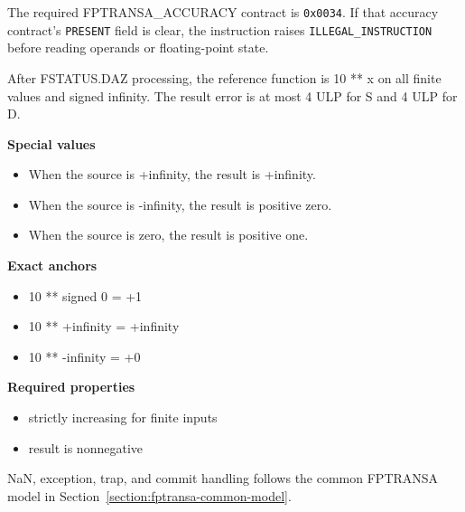 The required FPTRANSA\_ACCURACY contract is \texttt{0x0034}. If that accuracy contract's \texttt{PRESENT} field is clear, the instruction raises \texttt{ILLEGAL\_INSTRUCTION} before reading operands or floating-point state.

After FSTATUS.DAZ processing, the reference function is 10 ** x on all finite values and signed infinity. The result error is at most 4 ULP for S and 4 ULP for D.

\textbf{Special values}\par
\begin{itemize}
\item When the source is +infinity, the result is +infinity.
\item When the source is -infinity, the result is positive zero.
\item When the source is zero, the result is positive one.
\end{itemize}

\textbf{Exact anchors}\par
\begin{itemize}
\item 10 ** signed 0 = +1
\item 10 ** +infinity = +infinity
\item 10 ** -infinity = +0
\end{itemize}

\textbf{Required properties}\par
\begin{itemize}
\item strictly increasing for finite inputs
\item result is nonnegative
\end{itemize}

NaN, exception, trap, and commit handling follows the common FPTRANSA model in Section~\ref{section:fptransa-common-model}.
